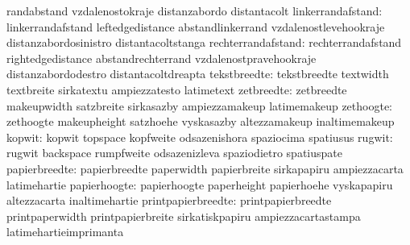                                   randabstand                      vzdalenostokraje
                                  distanzabordo                    distantacolt
               linkerrandafstand: linkerrandafstand                leftedgedistance
                                  abstandlinkerrand                vzdalenostlevehookraje
                                  distanzabordosinistro            distantacoltstanga
              rechterrandafstand: rechterrandafstand               rightedgedistance
                                  abstandrechterrand               vzdalenostpravehookraje
                                  distanzabordodestro              distantacoltdreapta
                    tekstbreedte: tekstbreedte                     textwidth
                                  textbreite                       sirkatextu
                                  ampiezzatesto                    latimetext
                      zetbreedte: zetbreedte                       makeupwidth
                                  satzbreite                       sirkasazby
                                  ampiezzamakeup                   latimemakeup %
                       zethoogte: zethoogte                        makeupheight
                                  satzhoehe                        vyskasazby
                                  altezzamakeup                    inaltimemakeup
                          kopwit: kopwit                           topspace
                                  kopfweite                        odsazenishora
                                  spaziocima                       spatiusus
                          rugwit: rugwit                           backspace
                                  rumpfweite                       odsazenizleva
                                  spaziodietro                     spatiuspate %
                   papierbreedte: papierbreedte                    paperwidth
                                  papierbreite                     sirkapapiru
                                  ampiezzacarta                    latimehartie
                    papierhoogte: papierhoogte                     paperheight
                                  papierhoehe                      vyskapapiru
                                  altezzacarta                     inaltimehartie
              printpapierbreedte: printpapierbreedte               printpaperwidth
                                  printpapierbreite                sirkatiskpapiru
                                  ampiezzacartastampa              latimehartieimprimanta %
